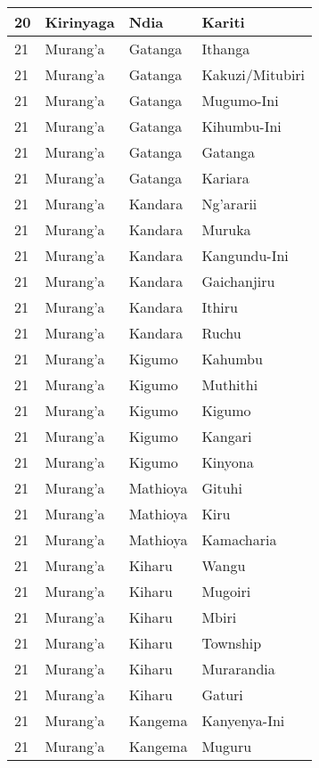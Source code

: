 \begin{table}[!ht]
\begin{tabular}{|l|l|l|l|}
        20 & Kirinyaga & Ndia & Kariti \\ \hline
        21 & Murang’a & Gatanga & Ithanga \\ \hline
        21 & Murang’a & Gatanga & Kakuzi/Mitubiri \\ \hline
        21 & Murang’a & Gatanga & Mugumo-Ini \\ \hline
        21 & Murang’a & Gatanga & Kihumbu-Ini \\ \hline
        21 & Murang’a & Gatanga & Gatanga \\ \hline
        21 & Murang’a & Gatanga & Kariara \\ \hline
        21 & Murang’a & Kandara & Ng’ararii \\ \hline
        21 & Murang’a & Kandara & Muruka \\ \hline
        21 & Murang’a & Kandara & Kangundu-Ini \\ \hline
        21 & Murang’a & Kandara & Gaichanjiru \\ \hline
        21 & Murang’a & Kandara & Ithiru \\ \hline
        21 & Murang’a & Kandara & Ruchu \\ \hline
        21 & Murang’a & Kigumo & Kahumbu \\ \hline
        21 & Murang’a & Kigumo & Muthithi \\ \hline
        21 & Murang’a & Kigumo & Kigumo \\ \hline
        21 & Murang’a & Kigumo & Kangari \\ \hline
        21 & Murang’a & Kigumo & Kinyona \\ \hline
        21 & Murang’a & Mathioya & Gituhi \\ \hline
        21 & Murang’a & Mathioya & Kiru \\ \hline
        21 & Murang’a & Mathioya & Kamacharia \\ \hline
        21 & Murang’a & Kiharu & Wangu \\ \hline
        21 & Murang’a & Kiharu & Mugoiri \\ \hline
        21 & Murang’a & Kiharu & Mbiri \\ \hline
        21 & Murang’a & Kiharu & Township \\ \hline
        21 & Murang’a & Kiharu & Murarandia \\ \hline
        21 & Murang’a & Kiharu & Gaturi \\ \hline
        21 & Murang’a & Kangema & Kanyenya-Ini \\ \hline
        21 & Murang’a & Kangema & Muguru \\ \hline

\end{tabular}
\end{table}
